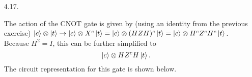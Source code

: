\documentclass[a4paper,12pt]{article}
\begin{document}
\begin{enumerate}
    \item[4.17.]
        \iffalse
        The matrix representing the action of the Hadamard matrix in the computational basis, with the top line as the control qubit, is
        \begin{align*}
            H_c =
            \left[ \begin{array}{cc}
                I & O \\
                O & H
            \end{array} \right] =
            \left[ \begin{array}{cccc}
                1 & 0 & 0 & 0 \\
                0 & 1 & 0 & 0 \\
                0 & 0 & 1/\sqrt{2} & 1/\sqrt{2} \\
                0 & 0 & 1/\sqrt{2} & -1/\sqrt{2}
            \end{array} \right]
        \end{align*}
        \fi
        The action of the CNOT gate is given by (using an identity from the previous exercise) $\ket{c} \otimes \ket{t} \rightarrow \ket{c} \otimes X^c \ket{t} = \ket{c} \otimes (HZH)^c \ket{t} = \ket{c} \otimes H^c Z^c H^c \ket{t}$. Because $H^2 = I$, this can be further simplified to
        \[
            \ket{c} \otimes H Z^c H \ket{t}.
        \] The circuit representation for this gate is shown below. \\[1.5in]


\end{enumerate}
\end{document}
